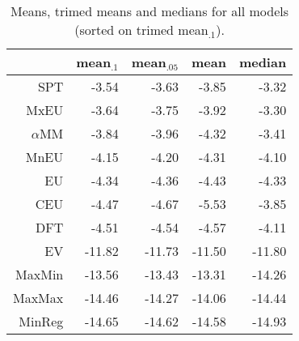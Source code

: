\begin{table}[!htb]
\centering
\begin{tabular}{rrrrr}
  \hline
 & mean$_{.1}$ & mean$_{.05}$ & mean & median \\ 
  \hline
SPT & -3.54 & -3.63 & -3.85 & -3.32 \\ 
  MxEU & -3.64 & -3.75 & -3.92 & -3.30 \\ 
  $\alpha$MM & -3.84 & -3.96 & -4.32 & -3.41 \\ 
  MnEU & -4.15 & -4.20 & -4.31 & -4.10 \\ 
  EU & -4.34 & -4.36 & -4.43 & -4.33 \\ 
  CEU & -4.47 & -4.67 & -5.53 & -3.85 \\ 
  DFT & -4.51 & -4.54 & -4.57 & -4.11 \\ 
  EV & -11.82 & -11.73 & -11.50 & -11.80 \\ 
  MaxMin & -13.56 & -13.43 & -13.31 & -14.26 \\ 
  MaxMax & -14.46 & -14.27 & -14.06 & -14.44 \\ 
  MinReg & -14.65 & -14.62 & -14.58 & -14.93 \\ 
   \hline
\end{tabular}
\caption{Means, trimed means and medians for all models (sorted on trimed mean$_{.1}$).} 
\label{table4_all_models_means}
\end{table}
